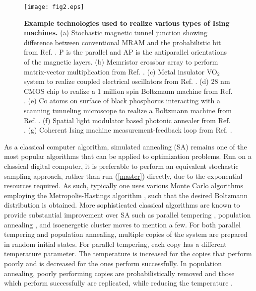 \documentclass[fleqn,10pt]{wlscirep}
\def\change#1{#1}
\begin{document}
%
\begin{figure}[t]
\begin{center}
\texttt{[image: fig2.eps]} 
\end{center}
\caption{ {\bf Example technologies used to realize various types of Ising machines.} (a) Stochastic magnetic tunnel junction showing difference between conventional MRAM and the probabilistic bit from Ref. \cite{borders2019integer}.  P is the parallel and AP is the antiparallel orientations of the magnetic layers.  (b) Memristor crossbar array to perform matrix-vector multiplication from Ref. \cite{cai2020power}.     (c) Metal insulator VO$_2$ system to realize coupled electrical oscillators from Ref. \cite{shukla2014synchronized}.  (d) 28 nm CMOS chip to realize a 1 million spin Boltzmann machine from Ref. \cite{merolla2014million}.   (e) Co atoms on surface of black phosphorus interacting with a scanning tunneling microscope to realize a Boltzmann machine from Ref. \cite{kiraly2021atomic}.  (f) Spatial light modulator based photonic annealer from Ref. \cite{pierangeli2019large}.   (g) Coherent Ising machine measurement-feedback loop from Ref. \cite{mcmahon2016fully}.   
\label{fig2}} 
\end{figure}
%
As a classical computer algorithm, simulated annealing \change{(SA)} remains one of the most popular algorithms that can be applied to optimization problems.  Run on a classical digital computer, it is  preferable to perform an equivalent stochastic sampling approach, rather than run (\ref{master}) directly, due to the exponential resources required.  As such, typically one uses various Monte Carlo algorithms employing the Metropolis-Hastings algorithm \cite{metropolis1953equation,hastings1970monte}, such that the desired Boltzmann distribution is obtained.  
More sophisticated classical algorithms are known to provide substantial improvement over \change{SA} such as parallel tempering \cite{PhysRevLett.57.2607,earl2005parallel}, population annealing \cite{wang2015population}, and  isoenergetic cluster moves \cite{zhu2015efficient} to mention a few. For both  parallel tempering and population annealing, multiple copies of the system are prepared in random  initial states. For parallel tempering, each copy has  a different temperature parameter. The temperature is increased for the copies that perform poorly and is decreased for the ones perform successfully. In population annealing,   poorly performing copies are probabilistically removed and those which perform successfully are replicated, while reducing the temperature \cite{kirkpatrick1983optimization,vcerny1985thermodynamical}. 
\end{document}
